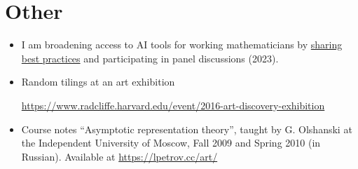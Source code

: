 \documentclass[letterpaper,11pt]{article}
\begin{document}
\section*{Other}

\begin{itemize}
	\item 
	I am broadening access to AI tools for working mathematicians by \href{https://lpetrov.cc/AI-math/}{sharing best practices} and participating in panel discussions (2023). 



	\item
	Random tilings at an art exhibition

	\url{https://www.radcliffe.harvard.edu/event/2016-art-discovery-exhibition}
	\item
	Course notes 
	``Asymptotic representation theory'',
	taught by G. Olshanski 
	at the Independent University of Moscow,
	Fall 2009 and Spring 2010 (in Russian). 
	Available at \url{https://lpetrov.cc/art/}

\end{itemize}






\end{document}
